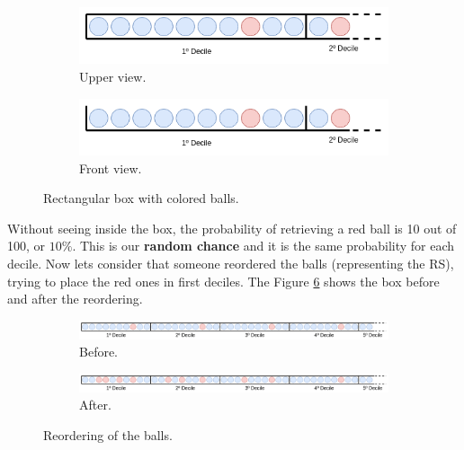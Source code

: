 \begin{figure}[!ht]
    \begin{subfigure}{\linewidth}
        \centering
        \includegraphics[width=\linewidth]{fig/ch2-rec-box-upper.png}
        \caption{Upper view.}
        \label{fig:rec-box:upper}
    \end{subfigure}
    \begin{subfigure}{\linewidth}
        \centering
        \includegraphics[width=\linewidth]{fig/ch2-rec-box-front.png}
        \caption{Front view.}
        \label{fig:rec-box:front}
    \end{subfigure}
    \caption{Rectangular box with colored balls.}
    \label{fig:rec-box}
\end{figure}

Without seeing inside the box, the probability of retrieving a red ball is 10 out of 100, or \textbf{$10\%$}. This is our \textbf{random chance} and it is the same probability for each decile. Now lets consider that someone reordered the balls (representing the RS), trying to place the red ones in first deciles. The Figure \ref{fig:rec-box-ordering} shows the box before and after the reordering.

\begin{figure}[!ht]
    \begin{subfigure}{\linewidth}
        \centering
        \includegraphics[width=\linewidth]{fig/ch2-rec-box-ordering-before.png}
        \caption{Before.}
        \label{fig:rec-box-ordering:before}
    \end{subfigure}
    \begin{subfigure}{\linewidth}
        \centering
        \includegraphics[width=\linewidth]{fig/ch2-rec-box-ordering-after.png}
        \caption{After.}
        \label{fig:rec-box-ordering:after}
    \end{subfigure}
    \caption{Reordering of the balls.}
    \label{fig:rec-box-ordering}
\end{figure}

